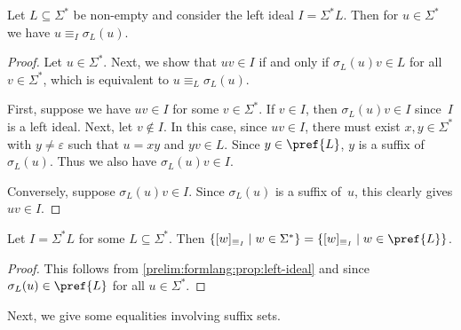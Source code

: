 \begin{proposition} \label{prelim:formlang:prop:left-ideal}
	Let $L \subseteq \Sigma^*$ be non-empty and consider the left ideal $I = \Sigma^*L$.
	Then for $u \in \Sigma^*$ we have $u \equiv_I \sigma_L(u)$.	
\end{proposition}
\begin{proof}
	Let $u \in \Sigma^*$. Next, we show that $uv \in I$
	if and only if $\sigma_L(u)v \in L$ for all $v \in \Sigma^*$,
	which is equivalent to $u \equiv_L \sigma_L(u)$.
		
	First, suppose we have $uv \in I$ for some $v \in \Sigma^*$.
	If $v \in I$, then $\sigma_L(u)v \in I$ since~$I$ is a left ideal.
	Next, let $v \notin I$.
	In this case, since $uv \in I$,
	there must exist $x,y \in \Sigma^*$
	with $y \ne \varepsilon$
	such that $u = xy$ and $yv \in L$.
	Since $y \in \pref{L}$, $y$	is a suffix of $\sigma_L(u)$.
	Thus we also have $\sigma_L(u)v \in I$.
	
	Conversely, suppose $\sigma_L(u)v \in I$.
	Since $\sigma_L(u)$ is a suffix of~$u$,
	this clearly gives $uv \in I$. 	
\end{proof}

\begin{corollary} \label{prelim:formlang:cor:left-ideal}
	Let $I = \Sigma^*L$ for some $L \subseteq \Sigma^*$.
	Then $\{ [w]_{\equiv_I} \mid w \in \Sigma^* \}
	= \{ [w]_{\equiv_I} \mid w \in \pref{L} \}$.	
\end{corollary}
\begin{proof}
	This follows from \cref{prelim:formlang:prop:left-ideal} 
	and since $\sigma_L(u) \in \pref{L}$ for all $u \in \Sigma^*$.
\end{proof}

Next, we give some equalities involving suffix sets.

